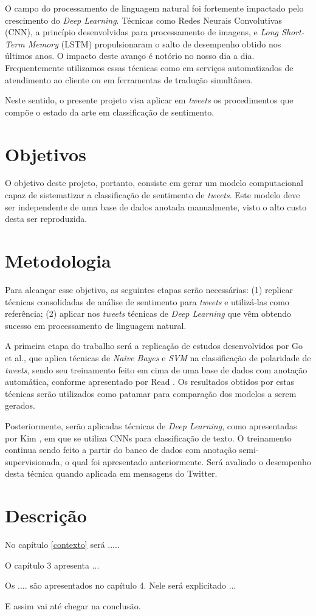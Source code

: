 O campo do processamento de linguagem natural foi fortemente impactado pelo crescimento do \textit{Deep Learning}. Técnicas como Redes Neurais Convolutivas (CNN), a princípio desenvolvidas para processamento de imagens, e \textit{Long Short-Term Memory} (LSTM) propulsionaram o salto de desempenho obtido nos últimos anos. O impacto deste avanço é notório no nosso dia a dia. Frequentemente utilizamos essas técnicas como em serviços automatizados de atendimento ao cliente ou em ferramentas de tradução simultânea.

Neste sentido, o presente projeto visa aplicar em \textit{tweets} os procedimentos que compõe o estado da arte em classificação de sentimento.

\section{Objetivos}

O objetivo deste projeto, portanto, consiste em gerar um modelo computacional capaz de sistematizar a classificação de sentimento de \textit{tweets}. Este modelo deve ser independente de uma base de dados anotada manualmente, visto o alto custo desta ser reproduzida.

\section{Metodologia}

Para alcançar esse objetivo, as seguintes etapas serão necessárias: (1) replicar técnicas consolidadas de análise de sentimento para \textit{tweets} e utilizá-las como referência; (2) aplicar nos \textit{tweets} técnicas de \textit{Deep Learning} que vêm obtendo sucesso em processamento de linguagem natural.

A primeira etapa do trabalho será a replicação de estudos desenvolvidos por Go et al., \cite{go09} que aplica técnicas de \textit{Naïve Bayes} e \textit{SVM} na classificação de polaridade de \textit{tweets}, sendo seu treinamento feito em cima de uma base de dados com anotação automática, conforme apresentado por Read \cite{read05}. Os resultados obtidos por estas técnicas serão utilizados como patamar para comparação dos modelos a serem gerados.

Posteriormente, serão aplicadas técnicas de \textit{Deep Learning}, como apresentadas por Kim \cite{kim14}, em que se utiliza CNNs para classificação de texto. O treinamento continua sendo feito a partir do banco de dados com anotação semi-supervisionada, o qual foi apresentado anteriormente. Será avaliado o desempenho desta técnica quando aplicada em mensagens do Twitter.

\section{Descrição}

No capítulo \ref{contexto} será .....

O capítulo 3 apresenta ...

Os .... são apresentados no capítulo 4. Nele será explicitado ...

E assim vai até chegar na conclusão.
